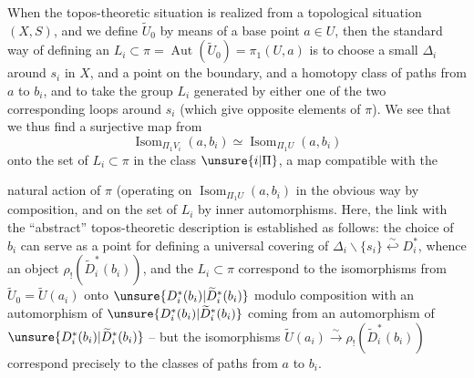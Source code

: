 When  the topos-theoretic situation is realized from a topological situation \((X,S)\), and we define \(\widetilde U_0\) by means of a base point \(a\in U\), then the standard way of defining an \(L_i\subset\pi=\operatorname{Aut}(\widetilde U_0)=\pi_1(U,a)\) is to choose a small  \(\Delta_i\) around \(s_i\) in \(X\),
and a point  on the boundary, and a homotopy class of paths  from \(a\) to \(b_i\), and to take the group \(L_i\) generated by either one of the two corresponding loops around \(s_i\) (which give  opposite elements of \(\pi\)).
We see that we thus find a surjective map from
\[
\operatorname{Isom}_{\Pi_1V_i}(a,b_i)\simeq
\operatorname{Isom}_{\Pi_1U}(a,b_i)
\]
 onto the set of \(L_i\subset\pi\) in the class \(\unsure{i|\Pi}\), a map  compatible with the


natural action of \(\pi\) (operating on \(\operatorname{Isom}_{\Pi_1U}(a,b_i)\) in the obvious way by composition, and on the set of \(L_i\) by inner automorphisms.
 Here, the  link with the ``abstract'' topos-theoretic description is established as follows: the choice of \(b_i\) can serve as a  point for defining a universal covering of \(\Delta_i\smallsetminus\{s_i\}\overset{\sim}{\hookleftarrow}D_i^*\), whence an object \(\rho_!(\widetilde D_i^*(b_i))\), and  the \(L_i\subset\pi\) correspond  to the isomorphisms from \(\widetilde U_0=\widetilde U(a_i)\) onto \(\unsure{D_i^*(b_i)|\widetilde D_i^*(b_i)}\) modulo composition with an automorphism of \(\unsure{D_i^*(b_i)|\widetilde D_i^*(b_i)}\) coming from an automorphism of \(\unsure{D_i^*(b_i)|\widetilde D_i^*(b_i)}\) -- but the isomorphisms  \(\widetilde U(a_i)\xrightarrow{\sim}\rho_!(\widetilde D_i^*(b_i))\) correspond precisely to the classes of paths from \(a\) to \(b_i\).

